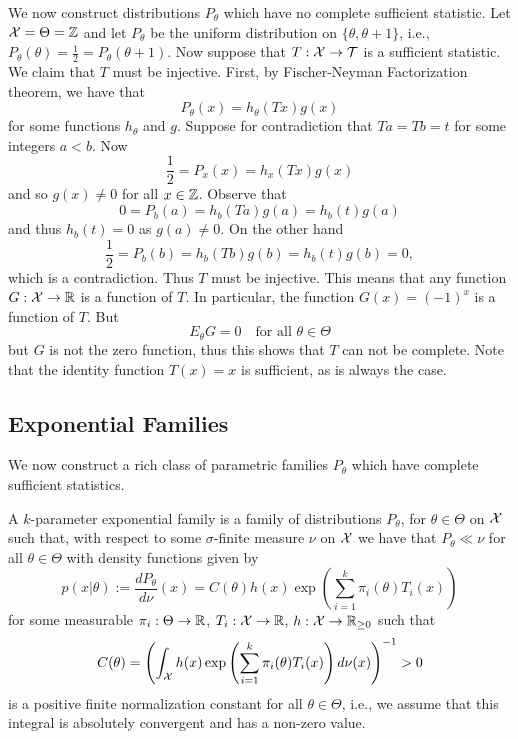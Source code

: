 \documentclass[twoside, a4paper, 10pt]{amsart}
\begin{document}
\begin{eg} We now construct distributions $P_{\theta}$ which have no complete sufficient statistic. Let $\mathcal{X} = \Theta = \mathbb{Z}$ and let $P_{\theta}$ be the uniform distribution on $\{\theta, \theta +1\}$, i.e., $P_{\theta}(\theta) = \frac{1}{2} = P_{\theta}(\theta+1)$. Now suppose that $T:\mathcal{X} \to \mathcal{T}$ is a sufficient statistic. We claim that $T$ must be injective. First, by Fischer-Neyman Factorization theorem, we have that $$P_{\theta}(x) = h_{\theta}(Tx)g(x)$$ for some functions $h_{\theta}$ and $g$. Suppose for contradiction that $Ta= Tb = t$ for some integers $a<b$. Now $$\frac{1}{2} = P_x(x) = h_x(Tx)g(x)$$ and so $g(x) \neq 0$ for all $x \in \mathbb{Z}$. Observe that $$ 0 = P_b(a) = h_b(Ta)g(a) = h_b(t)g(a)$$ and thus $h_b(t) = 0$ as $g(a) \neq 0$. On the other hand $$\frac{1}{2} = P_b(b) = h_b(Tb)g(b) = h_b(t)g(b) = 0,$$ which is a contradiction. Thus $T$ must be injective. This means that any function $G:\mathcal{X} \to \mathbb{R}$ is a function of $T$. In particular, the function $G(x) = (-1)^x$ is a function of $T$. But $$E_{\theta}G = 0 \quad \text{for all } \theta \in \Theta$$ but $G$ is not the zero function, thus this shows that $T$ can not be complete. Note that the identity function $T(x) = x$ is sufficient, as is always the case.\end{eg}

\subsection{Exponential Families}

We now construct a rich class of parametric families $P_{\theta}$ which have complete sufficient statistics.

\begin{mydef} A $k$-parameter exponential family is a family of distributions $P_{\theta}$, for $\theta \in \Theta$ on $\mathcal{X}$ such that, with respect to some $\sigma$-finite measure $\nu$ on $\mathcal{X}$ we have that $P_{\theta} \ll \nu$ for all $\theta \in \Theta$ with density functions given by $$p(x | \theta) := \frac{dP_{\theta}}{d\nu}(x) = C(\theta)h(x) \exp\left(\sum_{i=1}^k \pi_i(\theta) T_i(x) \right) $$ for some measurable $\pi_i: \Theta \to \mathbb{R}$, $T_i:\mathcal{X} \to \mathbb{R}$, $h:\mathcal{X} \to \mathbb{R}_{\geq 0}$ such that $$C(\theta) = \left( \int_{\mathcal{X}} h(x) \exp\left(\sum_{i=1}^k \pi_i(\theta) T_i(x) \right)  d\nu(x) \right)^{-1} > 0$$ is a positive finite normalization constant for all $\theta \in \Theta$, i.e., we assume that this integral is absolutely convergent and has a non-zero value.

\end{mydef}
\end{document}
